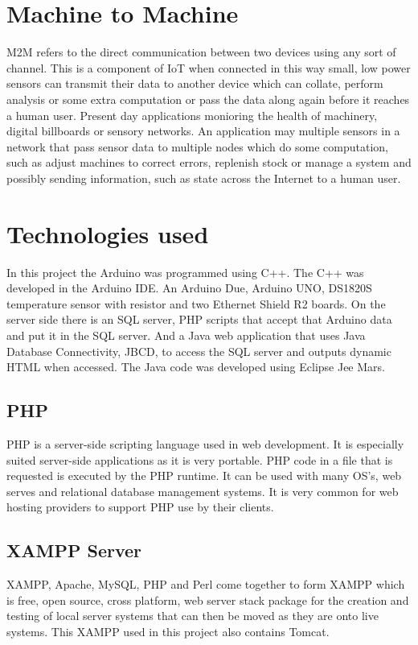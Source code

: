 \section{Machine to Machine}

M2M refers to the direct communication between two devices using any sort of channel. This is a component of IoT when connected in this way small, low power sensors can transmit their data to another device which can collate, perform analysis or some extra computation or pass the data along again before it reaches a human user. Present day applications monioring the health of machinery, digital billboards or sensory networks. An application may multiple sensors in a network that pass sensor data to multiple nodes which do some computation, such as adjust machines to correct errors, replenish stock or manage a system and possibly sending information, such as state across the Internet to a human user.

\section{Technologies used}

In this project the Arduino was programmed using C++. The C++ was developed in the Arduino IDE. An Arduino Due, Arduino UNO, DS1820S temperature sensor with resistor and two Ethernet Shield R2 boards. On the server side there is an SQL server, PHP scripts that accept that Arduino data and put it in the SQL server. And a Java web application that uses Java Database Connectivity, JBCD, to access the SQL server and outputs dynamic HTML when accessed. The Java code was developed using Eclipse Jee Mars.

\subsection{PHP}
PHP is a server-side scripting language used in web development. It is especially suited server-side applications as it is very portable. PHP code in a file that is requested is executed by the PHP runtime. It can be used with many OS's, web serves and relational database management systems. It is very common for web hosting providers to support PHP use by their clients.

\subsection{XAMPP Server}

XAMPP, Apache, MySQL, PHP and Perl come together to form XAMPP which is free, open source, cross platform, web server stack package for the creation and testing of local server systems that can then be moved as they are onto live systems. This XAMPP used in this project also contains Tomcat.

